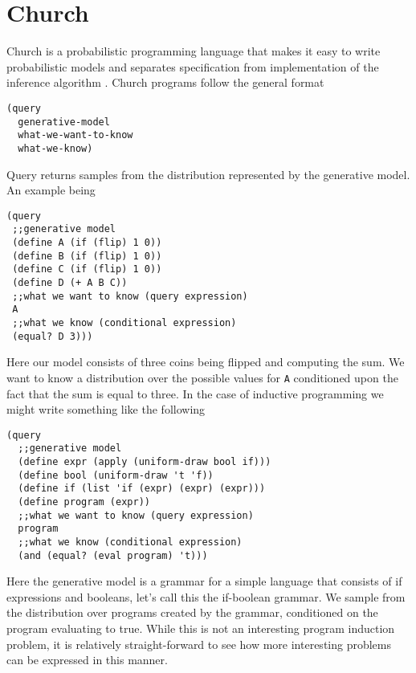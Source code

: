 \documentclass[a4paper,10pt]{article}
\begin{document}
\section{Church}
Church is a probabilistic programming language that makes it easy to write probabilistic models and separates specification from implementation of the inference algorithm \cite{essllitut}.  Church programs follow the general format
\begin{verbatim}
(query
  generative-model
  what-we-want-to-know
  what-we-know)
\end{verbatim}
Query returns samples from the distribution represented by the generative model. 
An example being
\begin{verbatim}
(query
 ;;generative model
 (define A (if (flip) 1 0))
 (define B (if (flip) 1 0))
 (define C (if (flip) 1 0))
 (define D (+ A B C))
 ;;what we want to know (query expression)
 A
 ;;what we know (conditional expression)
 (equal? D 3)))
 \end{verbatim}
Here our model consists of three coins being flipped and computing the sum.  We want to know a distribution over the possible values for \texttt{A} conditioned upon the fact that the sum is equal to three.  In the case of inductive programming we might write something like the following
\begin{verbatim}
(query
  ;;generative model
  (define expr (apply (uniform-draw bool if)))
  (define bool (uniform-draw 't 'f))
  (define if (list 'if (expr) (expr) (expr)))
  (define program (expr))
  ;;what we want to know (query expression)
  program
  ;;what we know (conditional expression)
  (and (equal? (eval program) 't)))
\end{verbatim}
Here the generative model is a grammar for a simple language that consists of if expressions and booleans, let's call this the if-boolean grammar.  We sample from the distribution over programs created by the grammar, conditioned on the program evaluating to true.  While this is not an interesting program induction problem, it is relatively straight-forward to see how more interesting problems can be expressed in this manner.
\end{document}
